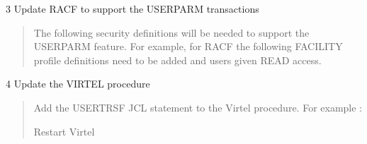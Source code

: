 \documentclass[letterpaper,10pt,english]{sphinxmanual}
\begin{document}
3   Update RACF to support the USERPARM transactions
\begin{quote}

The following security definitions will be needed to support the USERPARM feature. For example, for RACF the following FACILITY profile definitions need to be added and users given READ access.

\begin{sphinxVerbatim}[commandchars=\\\{\}]
    
   
    
          
   
    
            
   
    
  
\end{sphinxVerbatim}
\end{quote}

4   Update the VIRTEL procedure
\begin{quote}

Add the USERTRSF JCL statement to the Virtel procedure. For example :

\begin{sphinxVerbatim}[commandchars=\\\{\}]
   
\end{sphinxVerbatim}

Restart Virtel
\end{quote}
\end{document}
